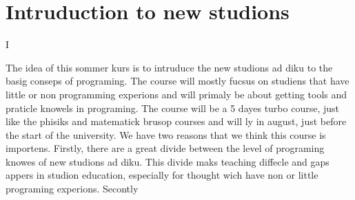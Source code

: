 \documentclass[12pt]{article}
\begin{document}
\maketitle


\section{Intruduction to new studions}
I





The idea of this sommer kurs is to intruduce the new studions ad diku to the basig conseps of programing. The course will mostly fucsus on studiens that have little or non programming experions and will primaly be about getting tools and praticle knowels in programing. The course will be a 5 dayes turbo course, just like the phisiks and matematick brusop courses and will ly in august, just before the start of the university. 
We have two reasons that we think this course is importens. Firstly, there are a great divide between the level of programing knowes of new studions ad diku. This divide maks teaching diffecle and gaps appers in studion education, especially for thought wich have non or little programing experions. Secontly 
\end{document}
